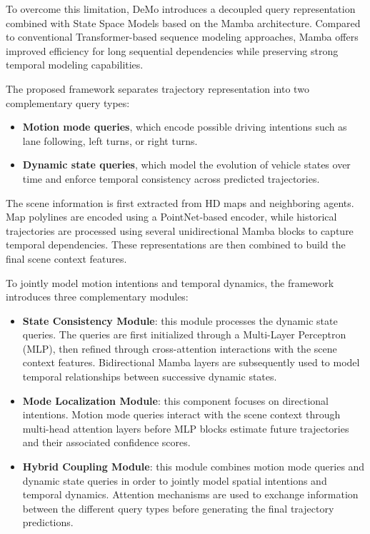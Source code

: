 \documentclass[conference]{IEEEtran}
\begin{document}
To overcome this limitation, DeMo introduces a decoupled query representation combined with State Space Models based on the Mamba architecture. Compared to conventional Transformer-based sequence modeling approaches, Mamba offers improved efficiency for long sequential dependencies while preserving strong temporal modeling capabilities.
\

The proposed framework separates trajectory representation into two complementary query types:
\begin{itemize}

\item \textbf{Motion mode queries}, which encode possible driving intentions such as lane following, left turns, or right turns.

\item \textbf{Dynamic state queries}, which model the evolution of vehicle states over time and enforce temporal consistency across predicted trajectories.

\end{itemize}

The scene information is first extracted from HD maps and neighboring agents. Map polylines are encoded using a PointNet-based encoder, while historical trajectories are processed using several unidirectional Mamba blocks to capture temporal dependencies. These representations are then combined to build the final scene context features.
\

To jointly model motion intentions and temporal dynamics, the framework introduces three complementary modules:
\begin{itemize}

\item \textbf{State Consistency Module}: this module processes the dynamic state queries. The queries are first initialized through a Multi-Layer Perceptron (MLP), then refined through cross-attention interactions with the scene context features. Bidirectional Mamba layers are subsequently used to model temporal relationships between successive dynamic states.

\item \textbf{Mode Localization Module}: this component focuses on directional intentions. Motion mode queries interact with the scene context through multi-head attention layers before MLP blocks estimate future trajectories and their associated confidence scores.

\item \textbf{Hybrid Coupling Module}: this module combines motion mode queries and dynamic state queries in order to jointly model spatial intentions and temporal dynamics. Attention mechanisms are used to exchange information between the different query types before generating the final trajectory predictions.

\end{itemize}
\end{document}
